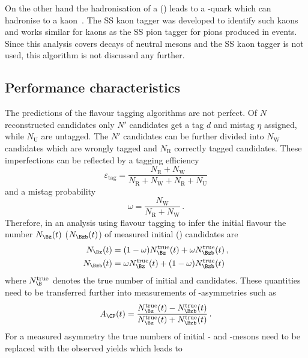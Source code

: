 On the other hand the hadronisation of a \Bs (\bquarkbar\squark) leads to a \squarkbar-quark which can hadronise to a kaon~\cite{Aaij:2016psi}.
The SS kaon tagger was developed to identify such kaons and works similar for kaons as the SS pion tagger for pions produced in \Bz events.
Since this analysis covers decays of neutral \Bz mesons and the SS kaon tagger is not used, this algorithm is not discussed any further.

\subsection{Performance characteristics}

The predictions of the flavour tagging algorithms are not perfect.
Of $N$ reconstructed candidates only $N'$ candidates get a tag $d$ and mistag $\eta$ assigned, while $N_{\text{U}}$ are untagged.
The $N'$ candidates can be further divided into $N_{\text{W}}$ candidates which are wrongly tagged and $N_{\text{R}}$ correctly tagged candidates.
These imperfections can be reflected by a tagging efficiency
\begin{equation}
\varepsilon_{\text{tag}}=\frac{N_{\text{R}}+N_{\text{W}}}{N_{\text{R}}+N_{\text{W}}+N_{\text{R}}+N_{\text{U}}}\label{eq:tageff}
\end{equation}
and a mistag probability
\begin{equation}
\omega=\frac{N_{\text{W}}}{N_{\text{R}}+N_{\text{W}}}\,.\label{eq:mistag}
\end{equation}
Therefore, in an analysis using flavour tagging to infer the initial \B flavour the number $N_{\Bz}(t)$ ($N_{\Bzb}(t)$) of measured initial \Bz (\Bzb) candidates are
\begin{equation}
\begin{aligned}
N_{\Bz}(t)&=(1-\omega)N_{\Bz}^{\text{true}}(t)+\omega N_{\Bzb}^{\text{true}}(t)\,,\\
N_{\Bzb}(t)&=\omega N_{\Bz}^{\text{true}}(t)+(1-\omega)N_{\Bzb}^{\text{true}}(t)
\end{aligned}
\end{equation}
where $N_{\B}^{\text{true}}$ denotes the true number of initial \Bz and \Bzb candidates.
These quantities need to be transferred further into measurements of \CP-asymmetries such as
\begin{equation}
A_{\CP}(t)=\frac{N_{\Bz}^{\text{true}}(t)-N_{\Bzb}^{\text{true}}(t)}{N_{\Bz}^{\text{true}}(t)+N_{\Bzb}^{\text{true}}(t)}\,.
\end{equation}
For a measured asymmetry the true numbers of initial \Bz- and \Bzb-mesons need to be replaced with the observed yields which leads to
